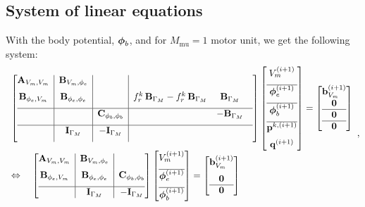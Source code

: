 \subsection{System of linear equations} 
With the body potential, $\boldsymbol{\phi}_b$, and for $M_\text{mu}=1$ motor unit, we get the following system:
\begin{equation*}
  \begin{array}{lll}
    \left[\begin{array}{@{}c|c|c|ccc@{}}
      \bfA_{V_m,V_m} & \bfB_{V_m,\phi_e} & &&\\[2mm]
      \bfB_{\phi_e,V_m} & \bfB_{\phi_e,\phi_e} & &f_r^k \,\bfB_{\Gamma_M}-f_r^k \,\bfB_{\Gamma_M}  & \bfB_{\Gamma_M}& \\[2mm] \hline
      &&\bfC_{\phi_b,\phi_b} & & -\bfB_{\Gamma_M}&\\[2mm]\hline
      & \bfI_{\Gamma_M} & -\bfI_{\Gamma_M} && &\\[2mm]
    \end{array}\right]
    \left[\begin{array}{@{}c@{}}
      V_{m}^{(i+1)}  \\[2mm]\hline 
      \bfphi_{e}^{(i+1)} \\[2mm]\hline
      \bfphi_{b}^{(i+1)} \\[2mm]\hline
      \bfp^{k,(i+1)} \\[2mm] 
      \bfq^{(i+1)}
    \end{array}\right]
    = 
    \left[\begin{array}{@{}c@{}}
      \bfb_{V_m}^{(i+1)} \\
      \bfzero \\\hline
      \bfzero\\\hline 
      \bfzero
    \end{array}\right]\\[4mm]
    \Leftrightarrow
    \quad 
    \left[\begin{array}{@{}c|c|c@{}}
      \bfA_{V_m,V_m} & \bfB_{V_m,\phi_e}\\[2mm]
      \bfB_{\phi_e,V_m} & \bfB_{\phi_e,\phi_e} & \bfC_{\phi_b,\phi_b}\\[2mm]\hline
      & \bfI_{\Gamma_M} & -\bfI_{\Gamma_M}
    \end{array}\right]
    \left[\begin{array}{@{}c@{}}
      V_{m}^{(i+1)}  \\[2mm]\hline 
      \bfphi_{e}^{(i+1)} \\[2mm]\hline
      \bfphi_{b}^{(i+1)} 
    \end{array}\right]
    = 
    \left[\begin{array}{@{}c@{}}
      \bfb_{V_m}^{(i+1)} \\[2mm]
      \bfzero\\\hline
      \bfzero
    \end{array}\right]
  \end{array},
\end{equation*}
